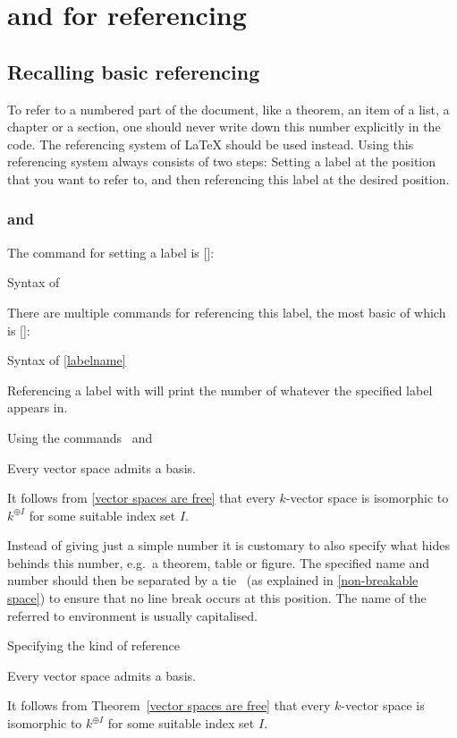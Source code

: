 \section{ and  for referencing}



\subsection{Recalling basic referencing}

To refer to a numbered part of the document, like a theorem, an item of a list, a chapter or a section, one should never write down this number explicitly in the code.
The referencing system of {\LaTeX} should be used instead.
Using this referencing system always consists of two steps:
Setting a label at the position that you want to refer to, and then referencing this label at the desired position.

\subsubsection{ and }

The command for setting a label is [\comname]:
\begin{showcode}{Syntax of }
\label{labelname}
\end{showcode}
There are multiple commands for referencing this label, the most basic of which is [\comname]:
\begin{showcode}{Syntax of }
\ref{labelname}
\end{showcode}
Referencing a label with  will print the number of whatever the specified label appears in.
\begin{showlatex}{Using the commands~ and~}
\begin{theorem}
  \label{vector spaces are free}
  Every vector space admits a basis.
\end{theorem}
It follows from \ref{vector spaces are free} that every $k$-vector space is isomorphic to $k^{\oplus I}$ for some suitable index set $I$.
\end{showlatex}

Instead of giving just a simple number it is customary to also specify what hides behinds this number, e.g.\ a theorem, table or figure.
The specified name and number should then be separated by a tie~\inlinecode{\customtexttilde} (as explained in \cref{non-breakable space}) to ensure that no line break occurs at this position.
The name of the referred to environment is usually capitalised.
\begin{showlatex}{Specifying the kind of reference}
\begin{theorem}
  \label{every vector space has a basis}
  Every vector space admits a basis.
\end{theorem}
It follows from Theorem~\ref{vector spaces are free} that every $k$-vector space is isomorphic to $k^{\oplus I}$ for some suitable index set $I$.
\end{showlatex}

